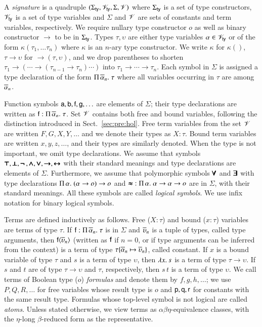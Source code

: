 A {\em signature} is a quadruple $(\Sigma_\mathsf{ty}, \mathscr{V}_\mathsf{ty}, \Sigma, \mathscr{V})$ where $\Sigma_\mathsf{ty}$ is a
set of type constructors, $\mathscr{V}_\mathsf{ty}$ is a set of type variables and $\Sigma$ and
$\mathscr{V}$ are sets of constants and term variables, respectively. We require nullary
type constructor $o$ as well as binary constructor $\rightarrow$
to be in $\Sigma_\mathsf{ty}$. Types $\tau, \upsilon$ are either type variables $\alpha \in
\mathscr{V}_\mathsf{ty}$ or of the form $\kappa(\tau_1, \ldots \tau_n)$ where $\kappa$ is an
$n$-ary type constructor. We write $\kappa$ for $\kappa()$, $\tau \rightarrow
\upsilon$ for $\rightarrow(\tau, \upsilon)$, and we drop parentheses to shorten 
$\tau_1 \rightarrow (\cdots \rightarrow (\tau_{n-1} \rightarrow \tau_n) \cdots)$ into $\tau_1 \rightarrow \cdots \rightarrow
\tau_n$. Each symbol in $\Sigma$ is
assigned a type declaration of the form $\Pi\,\overline{\alpha}_{n}.\; \tau$ where all variables
occurring in $\tau$ are among $\overline{\alpha}_{n}$.

Function symbols $\mathsf{a}, \mathsf{b}, \mathsf{f}, \mathsf{g}, \ldots$ are elements of
$\Sigma$; their type declarations are written as $\mathsf{f} :
\Pi\,\overline{\alpha}_{n}.\; \tau$. Set $\mathscr{V}$ contains both free and bound variables, following
the distinction introduced in Sect.~\ref{sec:pre:hol}. Free term variables from the set $\mathscr{V}$ are written
$F,G,X,Y, \ldots$ and we denote their types as $X : \tau$. Bound term variables are written $x,y,z,\ldots$,
and their types are similarly denoted. When the type is not
important, we omit type declarations. We assume that symbols $\pmb{\top},
\pmb{\bot},\pmb{\neg\,},\pmb{\land}, \pmb{\lor},\pmb{\rightarrow},\pmb{\leftrightarrow}$ with their standard meanings and type declarations are elements of
$\Sigma$. Furthermore, we assume that polymorphic symbols $\pmb{\forall}$ and $\pmb{\exists}$
with type declarations $\Pi\,\alpha.\; (\alpha \rightarrow o) \rightarrow o$
and $\pmb{\approx} \; : \Pi\,\alpha.\; {\alpha \rightarrow \alpha \rightarrow o}$ are
in $\Sigma$, with their standard meanings. All these symbols are called \emph{logical
symbols}. We use infix notation for binary logical symbols.

 Terms are defined inductively as follows. Free ($X : \tau$)  and bound ($x : \tau$) variables   are
terms of type $\tau$. If $\mathsf{f} : \Pi\,\overline{\alpha}_{n}.\; \tau$ is in
$\Sigma$ and $\overline{\upsilon}_{n}$ is a tuple of types, called type arguments, then
$\mathsf{f}{\langle\overline{\upsilon}_{n}\rangle}$ (written as $\mathsf{f}$ if $n=0$, or if type
arguments can be inferred from the context) is a term of type $\tau \{
\overline{\alpha}_{n} \mapsto \overline{\upsilon}_{n} \}$, called constant. If $x$ is a bound variable
of type $\tau$ and $s$ is a term of type $\upsilon$, then $\lambda x.\> s$ is a term of type
$\tau \rightarrow \upsilon$. If $s$ and $t$ are of type $\tau \rightarrow \upsilon$ and
$\tau$, respectively, then $s \, t$ is a term of type $\upsilon$. We call terms of
Boolean type ($o$) \emph{formulas} and denote them by $f,g,h, \ldots$; we use
$P,Q,R, \ldots$ for free variables whose result type is $o$ and
$\mathsf{p},\mathsf{q},\mathsf{r}$ for constants with the same result type.
%
Formulas whose top-level symbol is not logical are called \emph{atoms}.
Unless stated otherwise, we view terms as
$\alpha\beta\eta$-equivalence classes, with the $\eta$-long $\beta$-reduced form as
the representative.

